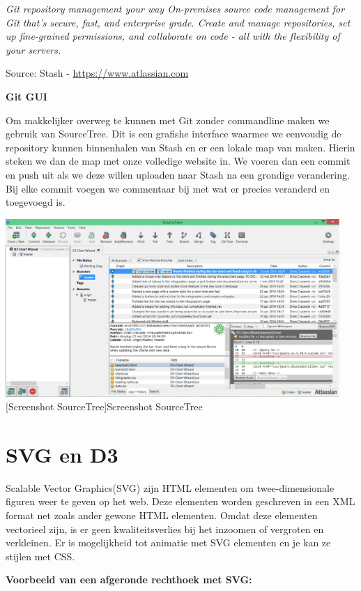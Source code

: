 \textit{Git repository management your way
On-premises source code management for Git that's secure, fast, and enterprise grade. Create and manage repositories, set up fine-grained permissions, and collaborate on code - all with the flexibility of your servers.}

Source: Stash - \url{https://www.atlassian.com}

\textbf{Git GUI}

Om makkelijker overweg te kunnen met Git zonder commandline maken we gebruik van SourceTree. Dit is een grafishe interface waarmee we eenvoudig de repository kunnen binnenhalen van Stash en er een lokale map van maken. Hierin steken we dan de map met onze volledige website in. We voeren dan een commit en push uit als we deze willen uploaden naar Stash na een grondige verandering. Bij elke commit voegen we commentaar bij met wat er precies veranderd en toegevoegd is.

\begin{center}
  \includegraphics[width=0.95\textwidth]{figures/chap2/sourcetree.png}
  [Screenshot SourceTree]{Screenshot SourceTree
  \label{fig_sourcetree}}
\end{center}

\section{SVG en D3}
Scalable Vector Graphics(SVG) zijn HTML elementen om twee-dimensionale figuren weer te geven op het web. Deze elementen worden geschreven in een XML format net zoals ander gewone HTML elementen. Omdat deze elementen vectorieel zijn, is er geen kwaliteitsverlies bij het inzoomen of vergroten en verkleinen. Er is mogelijkheid tot animatie met SVG elementen en je kan ze stijlen met CSS.

\textbf{Voorbeeld van een afgeronde rechthoek met SVG:}

